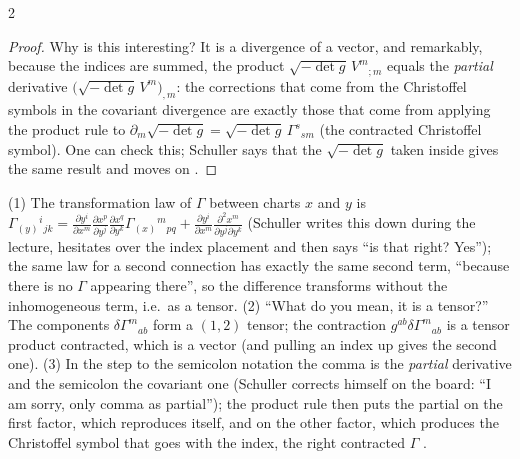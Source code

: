 \begin{paracol}{2}
\begin{proof}
Why is this interesting? It is a divergence of a vector, and remarkably, because the indices are summed, the product $\sqrt{-\det g}\,V^m{}_{;m}$ equals the \emph{partial} derivative $\bigl(\sqrt{-\det g}\,V^m\bigr)_{,m}$: the corrections that come from the Christoffel symbols in the covariant divergence are exactly those that come from applying the product rule to $\partial_m\sqrt{-\det g}=\sqrt{-\det g}\,\Gamma^s{}_{sm}$ (the contracted Christoffel symbol). One can check this; Schuller says that the $\sqrt{-\det g}$ taken inside gives the same result and moves on .
\end{proof}
\begin{coursenote}
(1) The transformation law of $\Gamma$ between charts $x$ and $y$ is $\Gamma_{(y)}{}^i{}_{jk}=\frac{\partial y^i}{\partial x^m}\frac{\partial x^p}{\partial y^j}\frac{\partial x^q}{\partial y^k}\Gamma_{(x)}{}^m{}_{pq}+\frac{\partial y^i}{\partial x^m}\frac{\partial^2x^m}{\partial y^j\partial y^k}$ (Schuller writes this down during the lecture, hesitates over the index placement and then says ``is that right? Yes''); the same law for a second connection has exactly the same second term, ``because there is no $\Gamma$ appearing there'', so the difference transforms without the inhomogeneous term, i.e.\ as a tensor. (2) ``What do you mean, it is a tensor?'' The components $\delta\Gamma^m{}_{ab}$ form a $(1,2)$ tensor; the contraction $g^{ab}\delta\Gamma^m{}_{ab}$ is a tensor product contracted, which is a vector (and pulling an index up gives the second one). (3) In the step to the semicolon notation the comma is the \emph{partial} derivative and the semicolon the covariant one (Schuller corrects himself on the board: ``I am sorry, only comma as partial''); the product rule then puts the partial on the first factor, which reproduces itself, and on the other factor, which produces the Christoffel symbol that goes with the index, the right contracted $\Gamma$ .
\end{coursenote}


\end{paracol}
